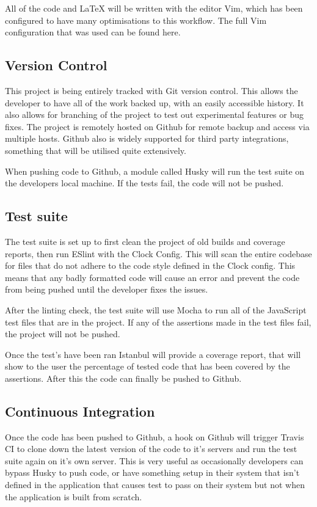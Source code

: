     All of the code and LaTeX will be written with the editor Vim, which has been configured to have many optimisations to this workflow. The full Vim configuration that was used can be found here\cite{.vimrc}.

  \subsection{Version Control}
    This project is being entirely tracked with Git version control. This allows the developer to have all of the work backed up, with an easily accessible history. It also allows for branching of the project to test out experimental features or bug fixes. The project is remotely hosted on Github\cite{github} for remote backup and access via multiple hosts. Github also is widely supported for third party integrations, something that will be utilised quite extensively. 

    When pushing code to Github, a module called Husky\cite{husky} will run the test suite on the developers local machine. If the tests fail, the code will not be pushed.

  \subsection{Test suite}
    The test suite is set up to first clean the project of old builds and coverage reports, then run ESlint\cite{eslint} with the Clock Config\cite{clockconfig}. This will scan the entire codebase for files that do not adhere to the code style defined in the Clock config. This means that any badly formatted code will cause an error and prevent the code from being pushed until the developer fixes the issues. 

    After the linting check, the test suite will use Mocha\cite{mocha} to run all of the JavaScript test files that are in the project. If any of the assertions made in the test files fail, the project will not be pushed. 

    Once the test's have been ran Istanbul\cite{istanbul} will provide a coverage report, that will show to the user the percentage of tested code that has been covered by the assertions. After this the code can finally be pushed to Github. 
    
  \subsection{Continuous Integration}
    Once the code has been pushed to Github, a hook on Github will trigger Travis CI\cite{travis} to clone down the latest version of the code to it's servers and run the test suite again on it's own server. This is very useful as occasionally developers can bypass Husky to push code, or have something setup in their system that isn't defined in the application that causes test to pass on their system but not when the application is built from scratch. 

